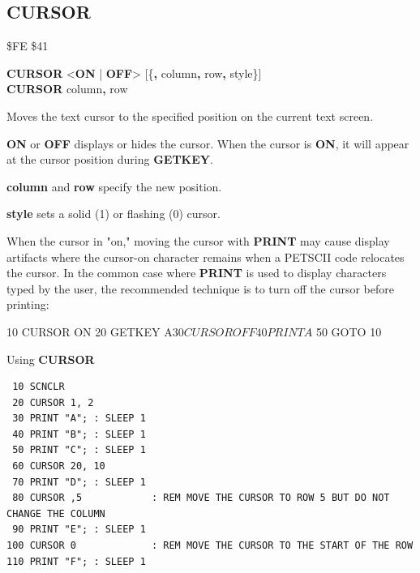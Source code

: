 
\newpage
\subsection{CURSOR}
\begin{description}[leftmargin=2cm,style=nextline]
\item [Token:]   \$FE \$41

\item [Format:]  {\bf CURSOR} <{\bf ON} | {\bf OFF}> [\{{\bf,} column{\bf,} row{\bf,} style\}] \\
                 {\bf CURSOR} column{\bf,} row{\bf}

\item [Usage:]   Moves the text cursor to the specified position on the current text screen.

                 {\bf ON} or {\bf OFF} displays or hides the cursor. When the cursor is {\bf ON}, it will appear at the cursor position during {\bf GETKEY}.

                 {\bf column} and {\bf row} specify the new position.

                 {\bf style} sets a solid (1) or flashing (0) cursor.

\item [Remarks:] When the cursor in "on," moving the cursor with {\bf PRINT} may cause display artifacts where the cursor-on character remains when a PETSCII code relocates the cursor. In the common case where {\bf PRINT} is used to display characters typed by the user, the recommended technique is to turn off the cursor before printing:

\begin{basiccode}
 10 CURSOR ON
 20 GETKEY A$
 30 CURSOR OFF
 40 PRINT A$
 50 GOTO 10
\end{basiccode}

\item [Example:] Using {\bf CURSOR}
\begin{tcolorbox}[colback=black,coltext=white]
\verbatimfont{\codefont}
\begin{verbatim}
 10 SCNCLR
 20 CURSOR 1, 2
 30 PRINT "A"; : SLEEP 1
 40 PRINT "B"; : SLEEP 1
 50 PRINT "C"; : SLEEP 1
 60 CURSOR 20, 10
 70 PRINT "D"; : SLEEP 1
 80 CURSOR ,5            : REM MOVE THE CURSOR TO ROW 5 BUT DO NOT CHANGE THE COLUMN
 90 PRINT "E"; : SLEEP 1
100 CURSOR 0             : REM MOVE THE CURSOR TO THE START OF THE ROW
110 PRINT "F"; : SLEEP 1
\end{verbatim}
\end{tcolorbox}
\end{description}

